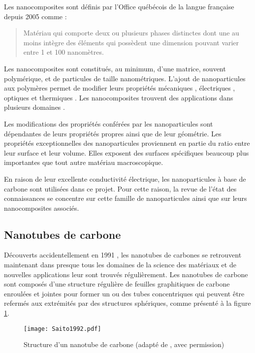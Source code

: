 Les nanocomposites sont définis par l'Office québécois de la langue française depuis 2005 comme : 

\begin{quote}
	Matériau qui comporte deux ou plusieurs phases distinctes dont une au moins intègre des éléments qui possèdent une dimension pouvant varier entre 1 et 100 nanomètres.
\end{quote}

Les nanocomposites sont constitués, au minimum, d'une matrice, souvent polymérique, et de particules de taille nanométriques. 
L'ajout de nanoparticules aux polymères permet de modifier leurs propriétés mécaniques \cite{Thostenson2002a}, électriques \cite{Zheng2003a}, optiques \cite{Hu2014} et thermiques \cite{Diez-Pascual2009, Al-Saleh2009c}. 
Les nanocomposites trouvent des applications dans plusieurs domaines \cite{Andrews2001, Thostenson2001c, Mittal2014h}. 

Les modifications des propriétés conférées par les nanoparticules sont dépendantes de leurs propriétés propres ainsi que de leur géométrie. 
Les propriétés exceptionnelles des nanoparticules proviennent en partie du ratio entre leur surface et leur volume. 
Elles exposent des surfaces spécifiques beaucoup plus importantes que tout autre matériau macroscopique. 

En raison de leur excellente conductivité électrique, les nanoparticules à base de carbone sont utilisées dans ce projet. 
Pour cette raison, la revue de l'état des connaissances se concentre sur cette famille de nanoparticules ainsi que sur leurs nanocomposites associés. 

\subsection{Nanotubes de carbone}

Découverts accidentellement en 1991 \cite{iijima1991}, les nanotubes de carbones se retrouvent maintenant dans presque tous les domaines de la science des matériaux et de nouvelles applications leur sont trouvés régulièrement. 
Les nanotubes de carbone sont composés d'une structure régulière de feuilles graphitiques de carbone enroulées et jointes pour former un ou des tubes concentriques qui peuvent être refermés aux extrémités par des structures sphériques, comme présenté à la figure \ref{structure_nanotube}. 

\begin{figure}[htb]
	\centering
	\texttt{[image: Saito1992.pdf]}
	\caption{Structure d'un nanotube de carbone (adapté de \cite{Saito1992}, avec permission)}
	\label{structure_nanotube}
\end{figure}

